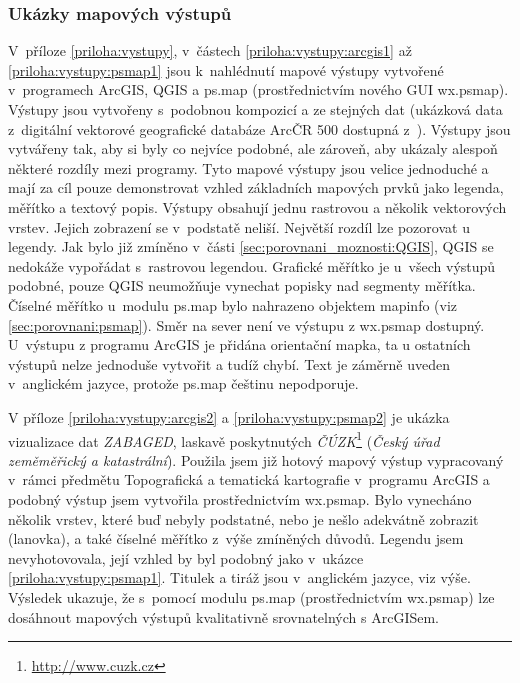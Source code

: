 \documentclass[a4paper,12pt,draft]{article}
\begin{document}
\subsubsection{Ukázky mapových výstupů}
V~příloze \ref{priloha:vystupy}, v~částech \ref{priloha:vystupy:arcgis1} až
\ref{priloha:vystupy:psmap1} jsou k~nahlédnutí mapové výstupy vytvořené
 v~programech ArcGIS, QGIS a ps.map (prostřednictvím nového GUI
wx.psmap). 
Výstupy jsou vytvořeny s~podobnou kompozicí a ze stejných dat (ukázková data
z~digitální vektorové geografické databáze ArcČR 500 dostupná
z~\cite{ArcCR500}). Výstupy jsou vytvářeny tak, aby si byly co nejvíce podobné,
ale zároveň, aby ukázaly alespoň některé  rozdíly mezi programy.
Tyto mapové výstupy jsou velice jednoduché a mají za cíl pouze demonstrovat
vzhled základních mapových prvků jako legenda, měřítko a textový popis. Výstupy
obsahují jednu rastrovou a několik vektorových vrstev. Jejich zobrazení se
v~podstatě neliší. Největší rozdíl lze pozorovat u legendy. Jak bylo již zmíněno
v~části \ref{sec:porovnani_moznosti:QGIS}, QGIS se nedokáže vypořádat
s~rastrovou legendou. Grafické měřítko je u~všech výstupů podobné, pouze QGIS
neumožňuje vynechat popisky nad segmenty měřítka. Číselné měřítko u~modulu
ps.map bylo nahrazeno objektem mapinfo (viz \ref{sec:porovnani:psmap}). Směr na
sever není ve výstupu z wx.psmap dostupný. U~výstupu z programu ArcGIS je
přidána orientační mapka, ta u ostatních výstupů nelze jednoduše
vytvořit a tudíž chybí. Text je záměrně uveden v~anglickém jazyce, protože
ps.map češtinu nepodporuje.

V příloze \ref{priloha:vystupy:arcgis2} a \ref{priloha:vystupy:psmap2} je
ukázka vizualizace dat \emph{ZABAGED},
laskavě poskytnutých \emph{ČÚZK}\footnote{\url{http://www.cuzk.cz}}
(\emph{Český úřad zeměměřický a katastrální}).
Použila jsem
již hotový mapový výstup vypracovaný v~rámci předmětu Topografická a tematická
kartografie \cite{TTKH} v~programu ArcGIS a podobný výstup jsem vytvořila
prostřednictvím wx.psmap. Bylo vynecháno několik vrstev, které buď nebyly
podstatné, nebo je nešlo adekvátně zobrazit (lanovka), a také číselné měřítko
z~výše zmíněných důvodů. Legendu jsem nevyhotovovala, její vzhled by byl
podobný jako v~ukázce \ref{priloha:vystupy:psmap1}. Titulek a tiráž jsou
v~anglickém jazyce, viz výše. Výsledek ukazuje, že s~pomocí modulu ps.map
(prostřednictvím wx.psmap) lze dosáhnout mapových výstupů kvalitativně
srovnatelných s ArcGISem.
\end{document}
